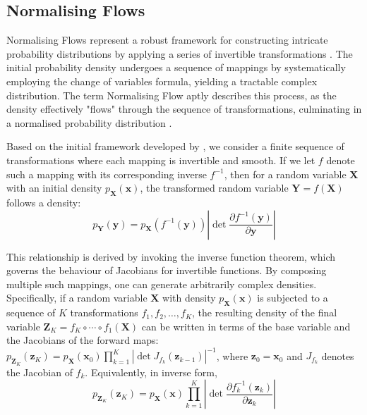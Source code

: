 \documentclass[risks,article,submit,pdftex,moreauthors]{Definitions/mdpi}
\begin{document}

\subsection{Normalising Flows}

Normalising Flows represent a robust framework for constructing intricate probability distributions by applying a series of invertible transformations \citep{rezende2015variational, mongwe2025analyzing}. The initial probability density undergoes a sequence of mappings by systematically employing the change of variables formula, yielding a tractable complex distribution. The term Normalising Flow aptly describes this process, as the density effectively "flows" through the sequence of transformations, culminating in a normalised probability distribution \citep{rezende2015variational}.

Based on the initial framework developed by \cite{rezende2015variational}, we consider a finite sequence of transformations where each mapping is invertible and smooth. If we let \( f \) denote such a mapping with its corresponding inverse \( f^{-1} \), then for a random variable \(\mathbf{X}\) with an initial density \( p_\mathbf{X}(\mathbf{x}) \), the transformed random variable \(\mathbf{Y} = f(\mathbf{X})\) follows a density:
\begin{equation}
p_\mathbf{Y}(\mathbf{y}) = p_\mathbf{X}\left(f^{-1}(\mathbf{y})\right) \left|\det \frac{\partial f^{-1}(\mathbf{y})}{\partial \mathbf{y}}\right|
\end{equation}


This relationship is derived by invoking the inverse function theorem, which governs the behaviour of Jacobians for invertible functions. By composing multiple such mappings, one can generate arbitrarily complex densities. Specifically, if a random variable \(\mathbf{X}\) with density \(p_\mathbf{X}(\mathbf{x})\) is subjected to a sequence of \(K\) transformations \(f_1, f_2, \dots, f_K\), the resulting density of the final variable \(\mathbf{Z}_K = f_K \circ \cdots \circ f_1(\mathbf{X})\) can be written in terms of the base variable and the Jacobians of the forward maps: \(p_{\mathbf{Z}_K}(\mathbf{z}_K) = p_\mathbf{X}(\mathbf{x}_0) \prod_{k=1}^{K} \left|\det J_{f_k}(\mathbf{z}_{k-1})\right|^{-1}\), where \(\mathbf{z}_0 = \mathbf{x}_0\) and \(J_{f_k}\) denotes the Jacobian of \(f_k\). Equivalently, in inverse form,
\begin{equation}
p_{\mathbf{Z}_K}(\mathbf{z}_K) = p_\mathbf{X}(\mathbf{x}) \prod_{k=1}^{K} \left|\det \frac{\partial f_k^{-1}(\mathbf{z}_k)}{\partial \mathbf{z}_k}\right|
\end{equation}
\end{document}
